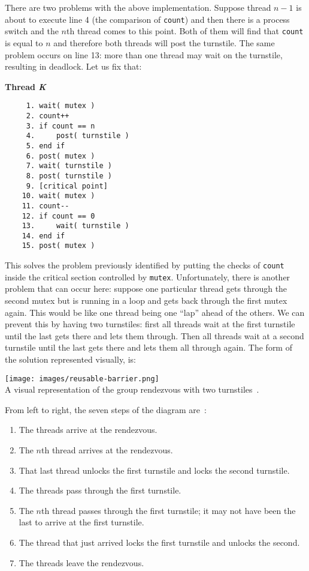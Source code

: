 There are two problems with the above implementation. Suppose thread $n-1$ is about to execute line 4 (the comparison of \texttt{count}) and then there is a process switch and the $n$th thread comes to this point. Both of them will find that \texttt{count} is equal to $n$ and therefore both threads will post the turnstile. The same problem occurs on line 13: more than one thread may wait on the turnstile, resulting in deadlock. Let us fix that:


\textbf{Thread \textit{K}}\vspace{-2em}
\begin{verbatim}
	 1. wait( mutex )
	 2. count++
	 3. if count == n
	 4.     post( turnstile )
	 5. end if
	 6. post( mutex )
	 7. wait( turnstile )
	 8. post( turnstile )
	 9. [critical point]
	10. wait( mutex )
	11. count--
	12. if count == 0
	13.     wait( turnstile )
	14. end if
	15. post( mutex )
  \end{verbatim}
\vspace{-2em}

This solves the problem previously identified by putting the checks of \texttt{count} inside the critical section controlled by \texttt{mutex}. Unfortunately, there is another problem that can occur here: suppose one particular thread gets through the second mutex but is running in a loop and gets back through the first mutex again. This would be like one thread being one ``lap'' ahead of the others. We can prevent this by having two turnstiles: first all threads wait at the first turnstile until the last gets there and lets them through. Then all threads wait at a second turnstile until the last gets there and lets them all through again. The form of the solution represented visually, is:

\begin{center}
	\texttt{[image: images/reusable-barrier.png]}\\
	A visual representation of the group rendezvous with two turnstiles~\cite{mte241}.
\end{center}

From left to right, the seven steps of the diagram are~\cite{mte241}:
\begin{enumerate}
	\item The threads arrive at the rendezvous.
	\item The $n$th thread arrives at the rendezvous.
	\item That last thread unlocks the first turnstile and locks the second turnstile.
	\item The threads pass through the first turnstile.
	\item The $n$th thread passes through the first turnstile; it may not have been the last to arrive at the first turnstile.
	\item The thread that just arrived locks the first turnstile and unlocks the second.
	\item The threads leave the rendezvous.
\end{enumerate}

